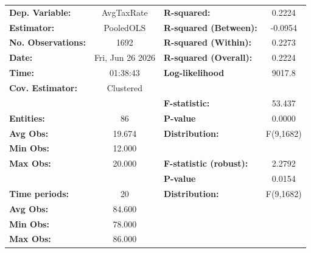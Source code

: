 \begin{center}
\begin{tabular}{lclc}
\toprule
\textbf{Dep. Variable:}                       &     AvgTaxRate     & \textbf{  R-squared:         }   &      0.2224      \\
\textbf{Estimator:}                           &     PooledOLS      & \textbf{  R-squared (Between):}  &     -0.0954      \\
\textbf{No. Observations:}                    &        1692        & \textbf{  R-squared (Within):}   &      0.2273      \\
\textbf{Date:}                                &  Fri, Jun 26 2026  & \textbf{  R-squared (Overall):}  &      0.2224      \\
\textbf{Time:}                                &      01:38:43      & \textbf{  Log-likelihood     }   &      9017.8      \\
\textbf{Cov. Estimator:}                      &     Clustered      & \textbf{                     }   &                  \\
\textbf{}                                     &                    & \textbf{  F-statistic:       }   &      53.437      \\
\textbf{Entities:}                            &         86         & \textbf{  P-value            }   &      0.0000      \\
\textbf{Avg Obs:}                             &       19.674       & \textbf{  Distribution:      }   &    F(9,1682)     \\
\textbf{Min Obs:}                             &       12.000       & \textbf{                     }   &                  \\
\textbf{Max Obs:}                             &       20.000       & \textbf{  F-statistic (robust):} &      2.2792      \\
\textbf{}                                     &                    & \textbf{  P-value            }   &      0.0154      \\
\textbf{Time periods:}                        &         20         & \textbf{  Distribution:      }   &    F(9,1682)     \\
\textbf{Avg Obs:}                             &       84.600       & \textbf{                     }   &                  \\
\textbf{Min Obs:}                             &       78.000       & \textbf{                     }   &                  \\
\textbf{Max Obs:}                             &       86.000       & \textbf{                     }   &                  \\

\end{tabular}
\end{center}
